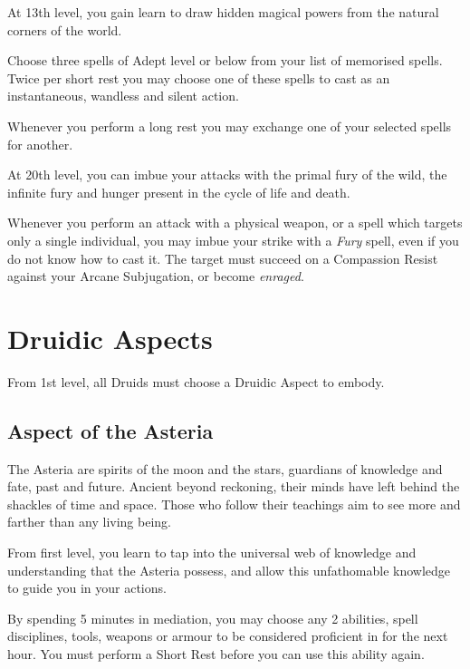 {
	At 13th level, you gain learn to draw hidden magical powers from the natural corners of the world. 
	
	Choose three spells of Adept level or below from your list of memorised spells. Twice per short rest you may choose one of these spells to cast as an instantaneous, wandless and silent action.
	
	Whenever you perform a long rest you may exchange one of your selected spells for another.  
}

{
	At 20th level, you can imbue your attacks with the primal fury of the wild, the infinite fury and hunger present in the cycle of life and death. 
	
	Whenever you perform an attack with a physical weapon, or a spell which targets only a single individual, you may imbue your strike with a {\it Fury} spell, even if you do not know how to cast it. The target must succeed on a Compassion Resist against your Arcane Subjugation, or become {\it enraged}.
}

\section*{Druidic Aspects}

From 1st level, all Druids must choose a Druidic Aspect to embody. 


\subsection{Aspect of the Asteria}

The Asteria are spirits of the moon and the stars, guardians of knowledge and fate, past and future. Ancient beyond reckoning, their minds have left behind the shackles of time and space. Those who follow their teachings aim to see more and farther than any living being. 

{
	From first level, you learn to tap into the universal web of knowledge and understanding that the Asteria possess, and allow this unfathomable knowledge to guide you in your actions. 
	
	By spending 5 minutes in mediation, you may choose any 2 abilities, spell disciplines, tools, weapons or armour to be considered proficient in for the next hour. You must perform a Short Rest before you can use this ability again. 
}

